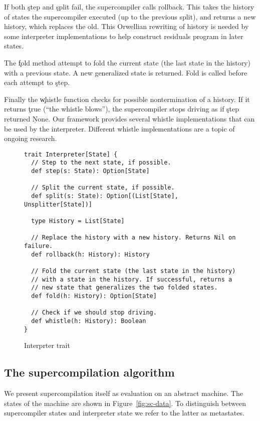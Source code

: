 If both \c{step} and \c{split} fail, the supercompiler calls \c{rollback}.
This takes the history of states the supercompiler executed (up to the
previous split), and returns a new history, which replaces the old.
This Orwellian rewriting of history is needed by some interpreter
implementations to help construct residuals program in later states.

The \c{fold} method attempt to fold the current state (the last
state in the history) with a previous state. A new generalized state
is returned. Fold is called before each attempt to \c{step}.

Finally the \c{whistle} function checks for possible nontermination
of a history.
If it returns \c{true} (``the whistle blows''), the supercompiler stops driving as if \c{step}
returned \c{None}. Our framework provides several whistle implementations
that can be used by the interpreter. Different whistle implementations are
a topic of ongoing research.

\begin{figure*}
  \begin{verbatim}
trait Interpreter[State] {
  // Step to the next state, if possible.
  def step(s: State): Option[State]

  // Split the current state, if possible.
  def split(s: State): Option[(List[State], Unsplitter[State])]

  type History = List[State]

  // Replace the history with a new history. Returns Nil on failure.
  def rollback(h: History): History

  // Fold the current state (the last state in the history)
  // with a state in the history. If successful, returns a
  // new state that generalizes the two folded states.
  def fold(h: History): Option[State]

  // Check if we should stop driving.
  def whistle(h: History): Boolean
}
  \end{verbatim}
  \caption{Interprter trait}
  \label{fig:interpreter}
\end{figure*}

\subsection{The supercompilation algorithm}

We present supercompilation itself as evaluation on an abstract machine.
The states of the machine are shown in Figure~\ref{fig:sc-data}.
To distinguish between supercompiler states and interpreter state we refer
to the latter as metastates.

